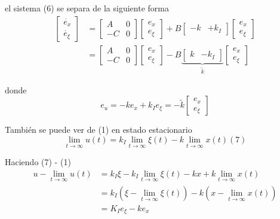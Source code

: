 el sistema (6) se separa de la siguiente forma
\[
    \begin{split}
    \begin{bmatrix}
        \dot{e_{x}} \\
        \dot{e_{\xi}}
    \end{bmatrix} & = 
    \begin{bmatrix}
        A & 0 \\
        -C & 0
    \end{bmatrix}
    \begin{bmatrix}
        e_{x} \\ 
        e_{\xi}
    \end{bmatrix}
    + B
    \begin{bmatrix}
        -k & +k_{I}
    \end{bmatrix}
    \begin{bmatrix}
        e_{x} \\ 
        e_{\xi}
    \end{bmatrix} \\
    & =
    \begin{bmatrix}
        A & 0 \\
        -C & 0
    \end{bmatrix}
    \begin{bmatrix}
        e_{x} \\ 
        e_{\xi}
    \end{bmatrix}
    - B
    \underbrace{
    \begin{bmatrix}
        k & -k_{I}
    \end{bmatrix}}_{\tilde{k}}
    \begin{bmatrix}
        e_{x} \\ 
        e_{\xi}
    \end{bmatrix}
    \end{split}
\]

donde 
\[ 
    e_{u} = -ke_{x} + k_{I}e_{\xi} = -\tilde{k} \begin{bmatrix}
        e_{x} \\ e_{\xi}
    \end{bmatrix} 
\]

También se puede ver de (1) en estado estacionario
\[
    \lim_{t \to \infty} u(t) = k_{I}\lim_{t \to \infty}\xi(t) - k\lim_{t \to \infty}x(t) (7)
\]

Haciendo (7) - (1)
\[
    \begin{split}
        u - \lim_{t \to \infty} u(t) & = k_{I}\xi - k_{I}\lim_{t \to \infty}\xi(t) - kx + k\lim_{t \to \infty}x(t) \\
        & = k_{I}(\xi - \lim_{t \to \infty}\xi(t)) - k(x - \lim_{t \to \infty}x(t)) \\
        & = K_{I}e_{\xi} - ke_{x}
    \end{split}
\]

